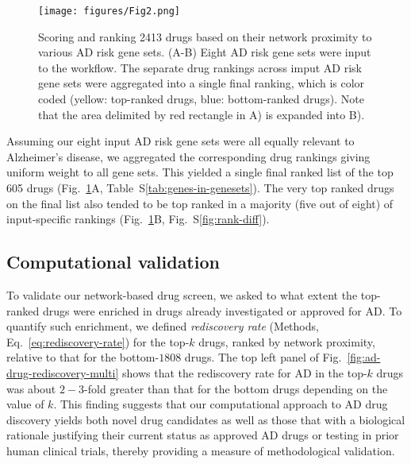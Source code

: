 \documentclass[letterpaper]{article}
\begin{document}
\begin{figure}
\texttt{[image: figures/Fig2.png]}\hspace{0.05\textwidth}
%
%
%

\caption{Scoring and ranking 2413 drugs based on their network proximity to
  various AD risk gene sets.  (A-B) Eight AD risk gene sets were input to the workflow.
  The separate drug rankings across imput AD risk gene sets were aggregated into a
  single final ranking, which is color coded (yellow: top-ranked drugs, blue:
  bottom-ranked drugs).  Note that the area delimited by red rectangle in A)
  is expanded into B).
}
\label{fig:screen}
\end{figure}

Assuming our eight input AD risk gene sets were all equally relevant to Alzheimer's
disease, we aggregated the corresponding drug rankings giving uniform weight
to all gene sets.  This yielded a single final ranked list of the top 605
drugs (Fig.~\ref{fig:screen}A, Table~S\ref{tab:genes-in-genesets}).  The very
top ranked drugs on the final list also tended to be top ranked in a majority
(five out of eight) of input-specific rankings (Fig.~\ref{fig:screen}B,
Fig.~S\ref{fig:rank-diff}).

\subsection{Computational validation}

To validate our network-based drug screen, we asked to what extent the
top-ranked drugs were enriched in drugs already investigated or approved for
AD.  To quantify such enrichment, we defined \emph{rediscovery rate} (Methods,
Eq.~\ref{eq:rediscovery-rate}) for the top-$k$ drugs, ranked by network
proximity, relative to that for the bottom-$1808$ drugs.  The top left panel
of Fig.~\ref{fig:ad-drug-rediscovery-multi} shows that the rediscovery rate
for AD in the top-$k$ drugs was about $2-3$-fold greater than that for the
bottom drugs depending on the value of $k$.  This finding suggests that our
computational approach to AD drug discovery yields both novel drug candidates
as well as those that with a biological rationale justifying their current
status as approved AD drugs or testing in prior human clinical trials, thereby
providing a measure of methodological validation.
\end{document}
